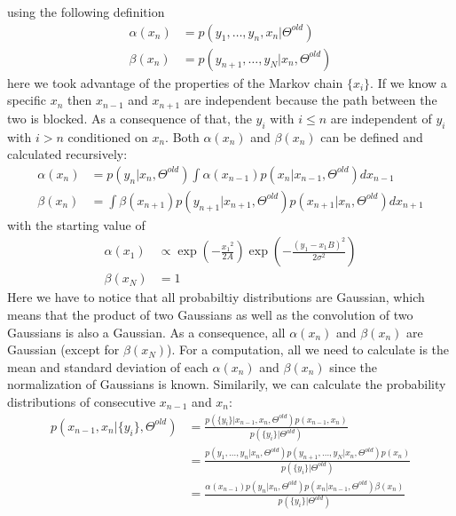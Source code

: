 \documentclass[%
 reprint,
 amsmath,amssymb,
 aps,
]{revtex4-1}
\begin{document}
using the following definition
\begin{equation}
	\begin{aligned}
	\alpha(x_{n})&=p(y_{1},\dots,y_{n},x_{n}|\Theta^{old})\\
	\beta(x_{n})&=p(y_{n+1},\dots,y_{N}|x_{n},\Theta^{old})
	\end{aligned}
\end{equation}
here we took advantage of the properties of the Markov chain $\{x_{i}\}$.  If we know a specific $x_{n}$ then $x_{n-1}$ and $x_{n+1}$ are independent because the path between the two is blocked.  As a consequence of that, the $y_{i}$ with $i\leq n$ are independent of $y_{i}$ with $i>n$ conditioned on $x_{n}$.  Both $\alpha(x_{n})$ and $\beta(x_{n})$ can be defined and calculated recursively:
\begin{equation}
	\begin{aligned}
	\alpha(x_{n})&=p(y_{n}|x_{n},\Theta^{old})\int \alpha(x_{n-1})p(x_{n}|x_{n-1},\Theta^{old})dx_{n-1}\\
	\beta(x_{n})&=\int \beta(x_{n+1})p(y_{n+1}|x_{n+1},\Theta^{old})p(x_{n+1}|x_{n},\Theta^{old})dx_{n+1}
	\end{aligned}
\end{equation}
with the starting value of
\begin{equation}
	\begin{aligned}
\alpha(x_{1})&\propto \exp \left( { - \frac{{x_1}^2}{2A}}\right)\exp \left( -\frac{{{{\left( {y_{1} - x_{1}B} \right)}^2}}}{{2\sigma^{2}}} \right)\\
\beta(x_{N})&=1
	\end{aligned}
\end{equation}
Here we have to notice that all probabiltiy distributions are Gaussian, which means that the product of two Gaussians as well as the convolution of two Gaussians is also a Gaussian.  As a consequence, all $\alpha(x_{n})$ and $\beta(x_{n})$ are Gaussian (except for $\beta(x_{N})$).  For a computation, all we need to calculate is the mean and standard deviation of each $\alpha(x_{n})$ and $\beta(x_{n})$ since the normalization of Gaussians is known.  Similarily, we can calculate the probability distributions of consecutive $x_{n-1}$ and $x_{n}$:
\begin{equation}\label{margxnxnmone}
	\begin{aligned}
	p\left( x_{n-1},x_{n}|\{y_{i}\},\Theta^{old}\right)&=\frac{p\left( \{y_{i}\}|x_{n-1},x_{n},\Theta^{old}\right)p(x_{n-1},x_{n})}{p(\{y_{i}\}|\Theta^{old})}\\
	&=\frac{p(y_{1},\dots,y_{n}|x_{n},\Theta^{old})p(y_{n+1},\dots,y_{N}|x_{n},\Theta^{old})p(x_{n})}{p(\{y_{i}\}|\Theta^{old})}\\
	&=\frac{\alpha(x_{n-1})p(y_{n}|x_{n},\Theta^{old})p(x_{n}|x_{n-1},\Theta^{old})\beta(x_{n})}{p(\{y_{i}\}|\Theta^{old})}
	\end{aligned}
\end{equation}
\end{document}

